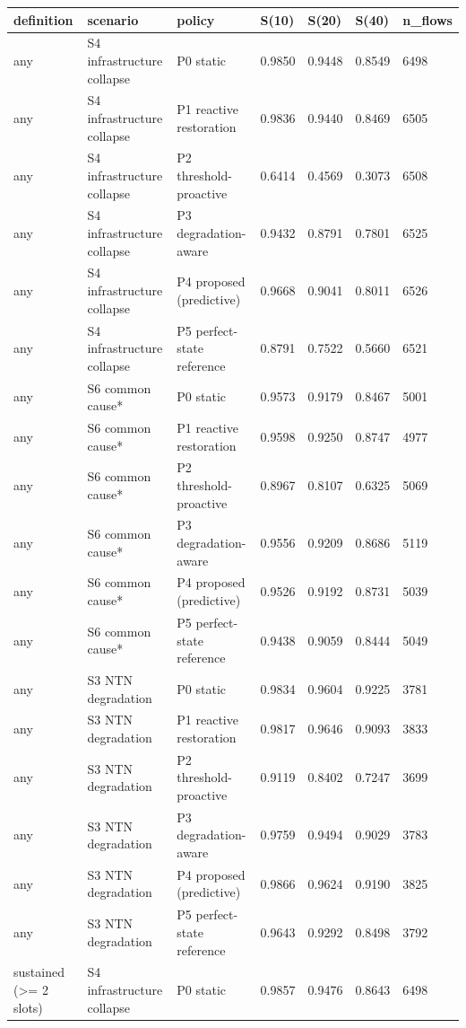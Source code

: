 \begin{tabular}{lllllll}
\toprule
definition & scenario & policy & S(10) & S(20) & S(40) & n\_flows \\
\midrule
any & S4 infrastructure collapse & P0 static & 0.9850 & 0.9448 & 0.8549 & 6498 \\
any & S4 infrastructure collapse & P1 reactive restoration & 0.9836 & 0.9440 & 0.8469 & 6505 \\
any & S4 infrastructure collapse & P2 threshold-proactive & 0.6414 & 0.4569 & 0.3073 & 6508 \\
any & S4 infrastructure collapse & P3 degradation-aware & 0.9432 & 0.8791 & 0.7801 & 6525 \\
any & S4 infrastructure collapse & P4 proposed (predictive) & 0.9668 & 0.9041 & 0.8011 & 6526 \\
any & S4 infrastructure collapse & P5 perfect-state reference & 0.8791 & 0.7522 & 0.5660 & 6521 \\
any & S6 common cause* & P0 static & 0.9573 & 0.9179 & 0.8467 & 5001 \\
any & S6 common cause* & P1 reactive restoration & 0.9598 & 0.9250 & 0.8747 & 4977 \\
any & S6 common cause* & P2 threshold-proactive & 0.8967 & 0.8107 & 0.6325 & 5069 \\
any & S6 common cause* & P3 degradation-aware & 0.9556 & 0.9209 & 0.8686 & 5119 \\
any & S6 common cause* & P4 proposed (predictive) & 0.9526 & 0.9192 & 0.8731 & 5039 \\
any & S6 common cause* & P5 perfect-state reference & 0.9438 & 0.9059 & 0.8444 & 5049 \\
any & S3 NTN degradation & P0 static & 0.9834 & 0.9604 & 0.9225 & 3781 \\
any & S3 NTN degradation & P1 reactive restoration & 0.9817 & 0.9646 & 0.9093 & 3833 \\
any & S3 NTN degradation & P2 threshold-proactive & 0.9119 & 0.8402 & 0.7247 & 3699 \\
any & S3 NTN degradation & P3 degradation-aware & 0.9759 & 0.9494 & 0.9029 & 3783 \\
any & S3 NTN degradation & P4 proposed (predictive) & 0.9866 & 0.9624 & 0.9190 & 3825 \\
any & S3 NTN degradation & P5 perfect-state reference & 0.9643 & 0.9292 & 0.8498 & 3792 \\
sustained (>= 2 slots) & S4 infrastructure collapse & P0 static & 0.9857 & 0.9476 & 0.8643 & 6498 \\

\end{tabular}
